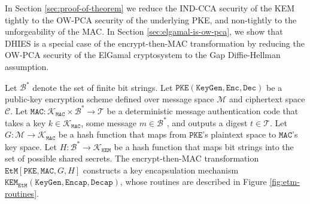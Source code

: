 \documentclass[journal=tches,submission]{iacrtrans}
\newcommand{\pke}{\texttt{PKE}}
\newcommand{\keygen}{\texttt{KeyGen}}
\newcommand{\encrypt}{\texttt{Enc}}
\newcommand{\decrypt}{\texttt{Dec}}
\newcommand{\kem}{\texttt{KEM}}
\newcommand{\encap}{\texttt{Encap}}
\newcommand{\decap}{\texttt{Decap}}
\newcommand{\etm}{\texttt{EtM}}  %
\newcommand{\mac}{\texttt{MAC}}
\begin{document}
In Section \ref{sec:proof-of-theorem} we reduce the IND-CCA security of the KEM tightly to the OW-PCA security of the underlying PKE, and non-tightly to the unforgeability of the MAC. In Section \ref{sec:elgamal-is-ow-pca}, we show that DHIES \cite{DBLP:conf/ctrsa/AbdallaBR01} is a special case of the encrypt-then-MAC transformation by reducing the OW-PCA security of the ElGamal cryptosystem to the Gap Diffie-Hellman assumption.

Let $\mathcal{B}^\ast$ denote the set of finite bit strings. Let $\pke(\keygen, \encrypt, \decrypt)$ be a public-key encryption scheme defined over message space $\mathcal{M}$ and ciphertext space $\mathcal{C}$. Let $\mac: \mathcal{K}_\mac \times \mathcal{B}^\ast \rightarrow \mathcal{T}$ be a deterministic message authentication code that takes a key $k \in \mathcal{K}_\mac$, some message $m \in \mathcal{B}^\ast$, and outputs a digest $t \in \mathcal{T}$. Let $G: \mathcal{M} \rightarrow \mathcal{K}_\mac$ be a hash function that maps from $\pke$'s plaintext space to $\mac$'s key space. Let $H: \mathcal{B}^\ast \rightarrow \mathcal{K}_\kem$ be a hash function that maps bit strings into the set of possible shared secrets. The encrypt-then-MAC transformation $\etm[\pke, \mac, G, H]$ constructs a key encapsulation mechanism $\kem_\etm(\keygen, \encap, \decap)$, whose routines are described in Figure \ref{fig:etm-routines}.
\end{document}
